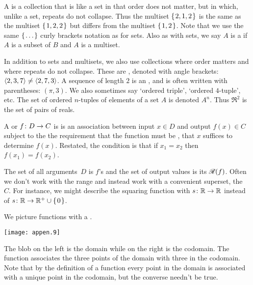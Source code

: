 A 
is a collection that is like a set in that order does not matter,
but in which, unlike a set, repeats do not collapse.
Thus the multiset $\mbox{$\{\hspace{0.1em}2,1,2\hspace{0.1em}\}$}$ is the same as the multiset
$\mbox{$\{\hspace{0.1em}1,2,2\hspace{0.1em}\}$}$  but differs from the multiset
$\mbox{$\{\hspace{0.1em}1,2\hspace{0.1em}\}$}$. 
Note that we use the same $\mbox{$\{\hspace{0.1em}\ldots\hspace{0.1em}\}$}$ 
curly brackets notation as for sets.
Also as with sets, we say $A$ is a  
if $A$ is a subset of $B$ and $A$ is a multiset.



In addition to sets and multisets,
we also use collections where order matters and where repeats do
not collapse.
These are , denoted with angle brackets:
\( \langle 2,3,7\rangle\neq\langle2,7,3\rangle \).
A sequence of length \( 2 \) is an 
,
and is often written with parentheses: \( (\pi,3) \).
We also sometimes say `ordered triple', `ordered \( 4 \)-tuple', etc.
The set of ordered \( n \)-tuples of elements of a set \( A \) is denoted
\( A^n \).
Thus \( \Re^2 \) is the set of pairs of reals.




A 
or   $\mbox{$f\colon D\to C$}$ is 
is an association between input
$x\in D$
and output
$f(x)\in C$ subject to the the requirement 
that the
function must be ,%
that \( x \) suffices to determine \( f(x) \).
Restated, the condition is that
if \( x_1=x_2 \) then \( f(x_1)=f(x_2) \).

The set of all arguments~$D$ is \( f \)'s 
and the set of output values is its 
 $\mathscr{R}(f)$.
Often we don't work with the range and instead
work with a convenient superset, the
~$C$.
For instance, we might describe the squaring function with $\mbox{$s\colon \mathbb{R}\to \mathbb{R}$}$
instead of $\mbox{$s\colon \mathbb{R}\to \mathbb{R}^+\cup \mbox{$\{\hspace{0.1em}0\hspace{0.1em}\}$}$}$.

We picture functions with a 
.
\begin{center}
  \texttt{[image: appen.9]}
\end{center}
The blob on the left is the domain while on the right is the
codomain.
The function associates the three points of the domain with three in the
codomain.
Note that by the definition of a function 
every point in the domain is associated with
a unique point in the codomain, but the converse needn't be true.

